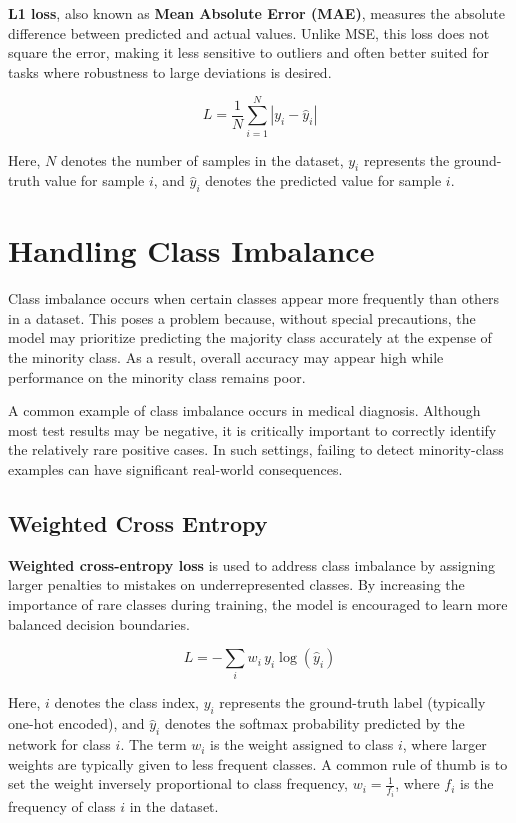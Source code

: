 \documentclass{article}
\begin{document}
\textbf{L1 loss}, also known as \textbf{Mean Absolute Error (MAE)}, measures the absolute difference between predicted and actual values. Unlike MSE, this loss does not square the error, making it less sensitive to outliers and often better suited for tasks where robustness to large deviations is desired.

\[
L = \frac{1}{N} \sum_{i=1}^{N} |y_i - \hat{y}_i|
\]

Here, \(N\) denotes the number of samples in the dataset, \(y_i\) represents the ground-truth value for sample \(i\), and \(\hat{y}_i\) denotes the predicted value for sample \(i\).


\section{Handling Class Imbalance}

Class imbalance occurs when certain classes appear more frequently than others in a dataset. This poses a problem because, without special precautions, the model may prioritize predicting the majority class accurately at the expense of the minority class. As a result, overall accuracy may appear high while performance on the minority class remains poor. 

A common example of class imbalance occurs in medical diagnosis. Although most test results may be negative, it is critically important to correctly identify the relatively rare positive cases. In such settings, failing to detect minority-class examples can have significant real-world consequences.

\subsection{Weighted Cross Entropy}

\textbf{Weighted cross-entropy loss} is used to address class imbalance by assigning larger penalties to mistakes on underrepresented classes. By increasing the importance of rare classes during training, the model is encouraged to learn more balanced decision boundaries.

\[
L = - \sum_i w_i \, y_i \log(\hat{y}_i)
\]

Here, \(i\) denotes the class index, \(y_i\) represents the ground-truth label (typically one-hot encoded), and \(\hat{y}_i\) denotes the softmax probability predicted by the network for class \(i\). The term \(w_i\) is the weight assigned to class \(i\), where larger weights are typically given to less frequent classes. A common rule of thumb is to set the weight inversely proportional to class frequency, \(w_i = \frac{1}{f_i}\), where \(f_i\) is the frequency of class \(i\) in the dataset.
\end{document}
